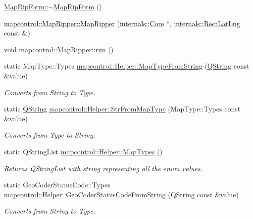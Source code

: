 \begin{DoxyCompactItemize}
\item 
\hyperlink{group___o_p_map_widget_gabc703f61b0a3e678f85ec3fa6b9c896a}{\-Map\-Rip\-Form\-::$\sim$\-Map\-Rip\-Form} ()
\item 
\hyperlink{group___o_p_map_widget_ga8c3645377b4deb3dc4d498de823ff3fd}{mapcontrol\-::\-Map\-Ripper\-::\-Map\-Ripper} (\hyperlink{classinternals_1_1_core}{internals\-::\-Core} $\ast$, \hyperlink{structinternals_1_1_rect_lat_lng}{internals\-::\-Rect\-Lat\-Lng} const \&)
\item 
\hyperlink{group___u_a_v_objects_plugin_ga444cf2ff3f0ecbe028adce838d373f5c}{void} \hyperlink{group___o_p_map_widget_gab955ee8425cb4937440d817492b47a88}{mapcontrol\-::\-Map\-Ripper\-::run} ()
\item 
static \-Map\-Type\-::\-Types \hyperlink{group___o_p_map_widget_gae829b229cde8f7beebc9f3c0981f674c}{mapcontrol\-::\-Helper\-::\-Map\-Type\-From\-String} (\hyperlink{group___u_a_v_objects_plugin_gab9d252f49c333c94a72f97ce3105a32d}{\-Q\-String} const \&value)
\begin{DoxyCompactList}\small\item\em \-Converts from \-String to \-Type. \end{DoxyCompactList}\item 
static \hyperlink{group___u_a_v_objects_plugin_gab9d252f49c333c94a72f97ce3105a32d}{\-Q\-String} \hyperlink{group___o_p_map_widget_ga25fd053ddcb478b681163806de9514b7}{mapcontrol\-::\-Helper\-::\-Str\-From\-Map\-Type} (\-Map\-Type\-::\-Types const \&value)
\begin{DoxyCompactList}\small\item\em \-Converts from \-Type to \-String. \end{DoxyCompactList}\item 
static \-Q\-String\-List \hyperlink{group___o_p_map_widget_gad4c683c34a93de153146c87382c53719}{mapcontrol\-::\-Helper\-::\-Map\-Types} ()
\begin{DoxyCompactList}\small\item\em \-Returns \-Q\-String\-List with string representing all the enum values. \end{DoxyCompactList}\item 
static \-Geo\-Coder\-Status\-Code\-::\-Types \hyperlink{group___o_p_map_widget_gad60261d49176a6eea081705bcd37c2b7}{mapcontrol\-::\-Helper\-::\-Geo\-Coder\-Status\-Code\-From\-String} (\hyperlink{group___u_a_v_objects_plugin_gab9d252f49c333c94a72f97ce3105a32d}{\-Q\-String} const \&value)
\begin{DoxyCompactList}\small\item\em \-Converts from \-String to \-Type. \end{DoxyCompactList}\item 

\end{DoxyCompactItemize}
